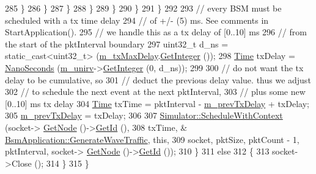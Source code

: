 \begin{DoxyCode}
285                                 \}
286                             \}
287                         \}
288                     \}
289                 \}
290             \}
291         \}
292 
293       \textcolor{comment}{// every BSM must be scheduled with a tx time delay}
294       \textcolor{comment}{// of +/- (5) ms.  See comments in StartApplication().}
295       \textcolor{comment}{// we handle this as a tx delay of [0..10] ms}
296       \textcolor{comment}{// from the start of the pktInterval boundary}
297       uint32\_t d\_ns = \textcolor{keyword}{static\_cast<}uint32\_t\textcolor{keyword}{>} (\hyperlink{classns3_1_1BsmApplication_a30f0fb812b58a1bf98ec17129283dcb8}{m\_txMaxDelay}.\hyperlink{classns3_1_1Time_a8c88e10860be3bc0cfabdbd92df42cff}{GetInteger} ());
298       \hyperlink{namespacens3_1_1TracedValueCallback_a7ffd3e7c142ffe7c8a1d2db9b8de38ec}{Time} txDelay = \hyperlink{group__timecivil_ga281d64bcb4dad96267d83c7688ec433f}{NanoSeconds} (\hyperlink{classns3_1_1BsmApplication_a8c6f7e06af51ef84b38358397b2d3cdc}{m\_unirv}->\hyperlink{classns3_1_1RandomVariableStream_a66cd94e6305ce7f000f1a9ff0fcb9aef}{GetInteger} (0, d\_ns));
299 
300       \textcolor{comment}{// do not want the tx delay to be cumulative, so}
301       \textcolor{comment}{// deduct the previous delay value.  thus we adjust}
302       \textcolor{comment}{// to schedule the next event at the next pktInterval,}
303       \textcolor{comment}{// plus some new [0..10] ms tx delay}
304       \hyperlink{namespacens3_1_1TracedValueCallback_a7ffd3e7c142ffe7c8a1d2db9b8de38ec}{Time} txTime = pktInterval - \hyperlink{classns3_1_1BsmApplication_a9fcac2779174fb7abfb6bcadf8c66f83}{m\_prevTxDelay} + txDelay;
305       \hyperlink{classns3_1_1BsmApplication_a9fcac2779174fb7abfb6bcadf8c66f83}{m\_prevTxDelay} = txDelay;
306 
307       \hyperlink{classns3_1_1Simulator_a86dbaef45a15a42365d7d2ae550449f6}{Simulator::ScheduleWithContext} (socket->
      \hyperlink{classns3_1_1Socket_aba642ad4301c1df47befc0aa9afa2e48}{GetNode} ()->\hyperlink{classns3_1_1Node_aaf49b64a843565ce3812326313b370ac}{GetId} (),
308                                       txTime, &
      \hyperlink{classns3_1_1BsmApplication_a22a009e7512e5df69dd9b81f96d15f51}{BsmApplication::GenerateWaveTraffic}, \textcolor{keyword}{this},
309                                       socket, pktSize, pktCount - 1, pktInterval,  socket->
      \hyperlink{classns3_1_1Socket_aba642ad4301c1df47befc0aa9afa2e48}{GetNode} ()->\hyperlink{classns3_1_1Node_aaf49b64a843565ce3812326313b370ac}{GetId} ());
310     \}
311   \textcolor{keywordflow}{else}
312     \{
313       socket->Close ();
314     \}
315 \}
\end{DoxyCode}


